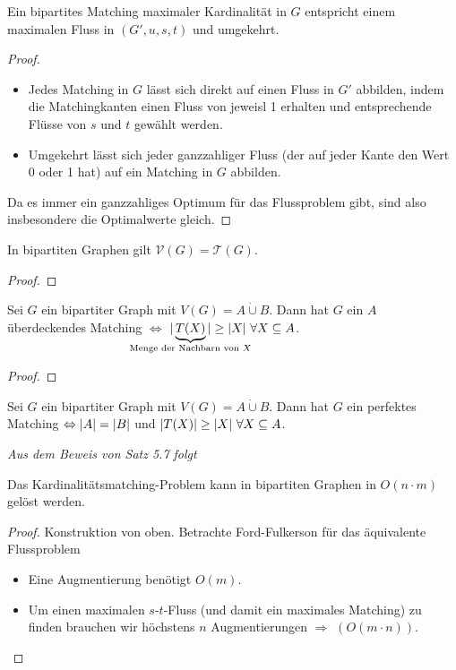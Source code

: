 \begin{satz}
	Ein bipartites Matching maximaler Kardinalität in $G$ entspricht einem maximalen Fluss in $(G',u,s,t)$ und umgekehrt.
\end{satz}
\begin{proof}~
	\begin{itemize}
		\item Jedes Matching in $G$ lässt sich direkt auf einen Fluss in $G'$ abbilden, indem die Matchingkanten einen Fluss von jeweisl 1 erhalten und entsprechende Flüsse von $s$ und $t$ gewählt werden.
		\item Umgekehrt lässt sich jeder ganzzahliger Fluss (der auf jeder Kante den Wert 0 oder 1 hat) auf ein Matching in $G$ abbilden.
	\end{itemize}
	Da es immer ein ganzzahliges Optimum für das Flussproblem gibt, sind also insbesondere die Optimalwerte gleich.
\end{proof}
\begin{satz}
	In bipartiten Graphen gilt $\mathcal{V}(G) = \mathcal{T}(G)$.
\end{satz}
\begin{proof}
	
\end{proof}
\begin{satz}
	Sei $G$ ein bipartiter Graph mit $V(G)=A\dot\cup B$. Dann hat $G$ ein $A$ überdeckendes Matching $\Leftrightarrow$ $\card{\underbrace{T(X)}_{\mathclap{\text{Menge der Nachbarn von } X}}} \ge \card{X}~\forall X\subseteq A$.
\end{satz}
\begin{proof}
	
\end{proof}
\begin{korollar}
	Sei $G$ ein bipartiter Graph mit $V(G) = A\dot\cup B$. Dann hat $G$ ein perfektes Matching $\Leftrightarrow \vert A \vert=\vert B \vert$ und $\vert T(X) \vert \ge \vert X \vert~\forall X \subseteq A$.
\end{korollar}
\textit{Aus dem Beweis von Satz 5.7 folgt}
\begin{korollar}
	Das Kardinalitätsmatching-Problem kann in bipartiten Graphen in $O(n\cdot m)$ gelöst werden.
\end{korollar}
\begin{proof}
	Konstruktion von oben. Betrachte Ford-Fulkerson für das äquivalente Flussproblem
	\begin{itemize}
		\item Eine Augmentierung benötigt $O(m)$.
		\item Um einen maximalen $s$-$t$-Fluss (und damit ein maximales Matching) zu finden brauchen wir höchstens $n$ Augmentierungen $\Rightarrow$ $(O(m\cdot n))$.
	\end{itemize}
\end{proof}
